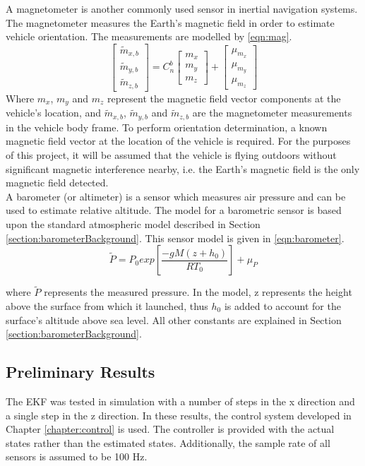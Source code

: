 A magnetometer is another commonly used sensor in inertial navigation systems. The magnetometer measures the Earth's magnetic field in order to estimate vehicle orientation. The measurements are modelled by \eqref{eqn:mag}.
\begin{equation}\label{eqn:mag}
\begin{bmatrix}
\tilde{m}_{x,b}\\
\tilde{m}_{y,b}\\
\tilde{m}_{z,b}
\end{bmatrix}
=
C^{b}_{n}
\begin{bmatrix}
m_{x}\\
m_{y}\\
m_{z}
\end{bmatrix}
+
\begin{bmatrix}
\mu_{m_{x}}\\
\mu_{m_{y}}\\
\mu_{m_{z}}
\end{bmatrix}
\end{equation}
Where $m_{x}$, $m_{y}$ and $m_{z}$ represent the magnetic field vector components at the vehicle's location, and $\tilde{m}_{x,b}$, $\tilde{m}_{y,b}$ and $\tilde{m}_{z,b}$ are the magnetometer measurements in the vehicle body frame. To perform orientation determination, a known magnetic field vector at the location of the vehicle is required. For the purposes of this project, it will be assumed that the vehicle is flying outdoors without significant magnetic interference nearby, i.e. the Earth's magnetic field is the only magnetic field detected.\\

A barometer (or altimeter) is a sensor which measures air pressure and can be used to estimate relative altitude. The model for a barometric sensor is based upon the standard atmospheric model described in Section \ref{section:barometerBackground}. This sensor model is given in \eqref{eqn:barometer}.
\begin{equation}\label{eqn:barometer}
\tilde{P}=P_{0}exp\left[\frac{-g M (z+h_{0})}{R T_{0}}\right]+\mu_{P}
\end{equation}

where $\tilde{P}$ represents the measured pressure. In the model, z represents the height above the surface from which it launched, thus $h_{0}$ is added to account for the surface's altitude above sea level. All other constants are explained in Section \ref{section:barometerBackground}.


\subsection{Preliminary Results}
The EKF was tested in simulation with a number of steps in the x direction and a single step in the z direction. In these results, the control system developed in Chapter \ref{chapter:control} is used. The controller is provided with the actual states rather than the estimated states. Additionally, the sample rate of all sensors is assumed to be 100 Hz.\\

